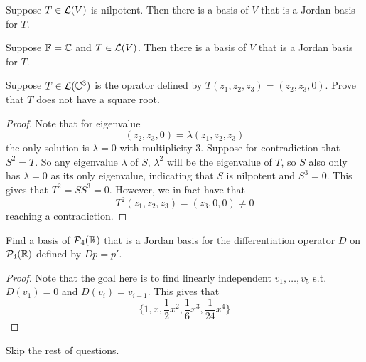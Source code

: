 \documentclass{extarticle}
\begin{document}
\begin{thm}
    Suppose \(T \in \mathcal{L}(V)\) is nilpotent. Then there is a basis of \(V\) that is a Jordan basis for \(T\).
\end{thm}


\begin{corollary}
    Suppose \(\mathbb{F} = \mathbb{C}\) and \(T \in \mathcal{L}(V)\). Then there is a basis of \(V\) that is a Jordan basis for 
    \(T\). 
\end{corollary}




\newpage 
{}


\begin{problem}{1}
    Suppose \(T \in \mathcal{L}(\mathbb{C}^3)\) is the oprator defined by \(T(z_1, z_2, z_3) = (z_2, z_3, 0)\). Prove that 
    \(T\) does not have a square root. 
\end{problem}

\begin{proof}
Note that for eigenvalue 
\[(z_2, z_3, 0) = \lambda(z_1, z_2, z_3)\]
the only solution is \(\lambda = 0\) with multiplicity 3. Suppose for contradiction that \(S^2 = T\). So 
any eigenvalue \(\lambda\) of \(S\), \(\lambda^2\) will be the eigenvalue of \(T\), so \(S\) also only 
has \(\lambda=0\) as its only eigenvalue, indicating that \(S\) is nilpotent and \(S^3 = 0\). This gives 
that \(T^2 = SS^3 = 0\). However, we in fact have that 
\[T^2 (z_1, z_2, z_3) = (z_3, 0, 0) \neq 0\]
reaching a contradiction.
\end{proof}

\begin{problem}{6}
    Find a basis of \(\mathcal{P}_4 (\mathbb{R})\) that is a Jordan basis for the differentiation operator 
    \(D\) on \(\mathcal{P}_4(\mathbb{R})\) defined by \(D p = p'\).
\end{problem}

\begin{proof}
Note that the goal here is to find linearly independent \(v_1, \ldots, v_5\) s.t. \(D(v_1) = 0\) and 
\(D(v_{i}) = v_{i-1}\). This gives that 
\[\{1, x, \frac{1}{2}x^2, \frac{1}{6}x^3, \frac{1}{24}x^4\}\]
\end{proof}


Skip the rest of questions.
\end{document}
